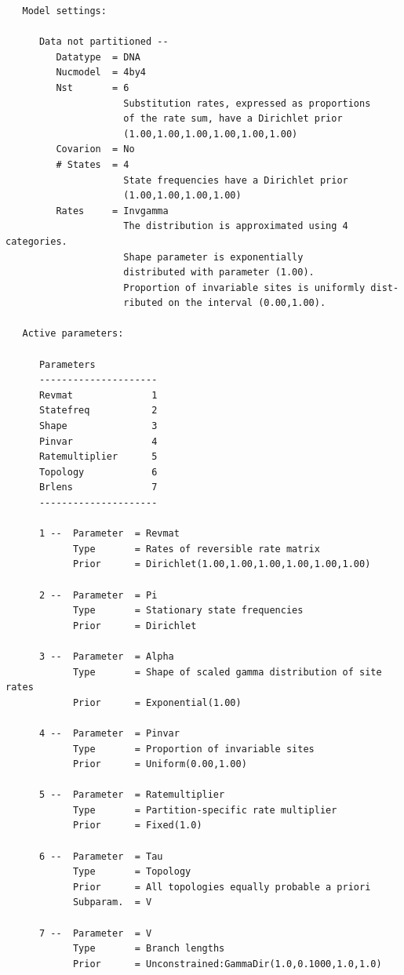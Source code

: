 \documentclass[12pt]{book}
\begin{document}
\begin{singlespacing}
\footnotesize
\begin{verbatim}
   Model settings:

      Data not partitioned --
         Datatype  = DNA
         Nucmodel  = 4by4
         Nst       = 6
                     Substitution rates, expressed as proportions
                     of the rate sum, have a Dirichlet prior
                     (1.00,1.00,1.00,1.00,1.00,1.00)
         Covarion  = No
         # States  = 4
                     State frequencies have a Dirichlet prior
                     (1.00,1.00,1.00,1.00)
         Rates     = Invgamma
                     The distribution is approximated using 4 categories.
                     Shape parameter is exponentially
                     distributed with parameter (1.00).
                     Proportion of invariable sites is uniformly dist-
                     ributed on the interval (0.00,1.00).

   Active parameters: 

      Parameters
      ---------------------
      Revmat              1
      Statefreq           2
      Shape               3
      Pinvar              4
      Ratemultiplier      5
      Topology            6
      Brlens              7
      ---------------------

      1 --  Parameter  = Revmat
            Type       = Rates of reversible rate matrix
            Prior      = Dirichlet(1.00,1.00,1.00,1.00,1.00,1.00)

      2 --  Parameter  = Pi
            Type       = Stationary state frequencies
            Prior      = Dirichlet

      3 --  Parameter  = Alpha
            Type       = Shape of scaled gamma distribution of site rates
            Prior      = Exponential(1.00)

      4 --  Parameter  = Pinvar
            Type       = Proportion of invariable sites
            Prior      = Uniform(0.00,1.00)

      5 --  Parameter  = Ratemultiplier
            Type       = Partition-specific rate multiplier
            Prior      = Fixed(1.0)

      6 --  Parameter  = Tau
            Type       = Topology
            Prior      = All topologies equally probable a priori
            Subparam.  = V

      7 --  Parameter  = V
            Type       = Branch lengths
            Prior      = Unconstrained:GammaDir(1.0,0.1000,1.0,1.0)

\end{verbatim}
\normalsize
\end{singlespacing}
\end{document}
